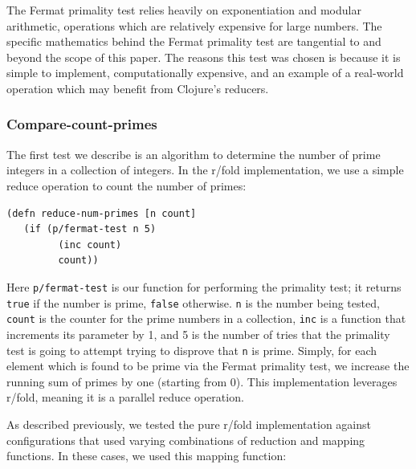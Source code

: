 \documentclass[12pt]{article}
\newcommand{\comment}[1]{{\bf \tt  {#1}}}
\newcommand{\emcomment}[1]{\textcolor{ForestGreen}{\comment{Elena: {#1}}}}
\newcommand{\joecomment}[1]{\textcolor{JoesGold}{\comment{Joe: {#1}}}}
\newcommand{\clocode}[1]{{\texttt {#1}}}
\begin{document}
The Fermat primality test relies heavily on exponentiation and modular arithmetic, operations which are relatively expensive for large numbers. %
The specific mathematics behind the Fermat primality test are tangential to and beyond the scope of this paper. The reasons this test was chosen is 
because it is simple to implement, computationally expensive, and an example of a real-world operation which may benefit from Clojure's reducers. 

\subsubsection{Compare-count-primes}\label{sec:count-primes}
The first test we describe is an algorithm to determine the number of prime integers in a  collection of integers. In the %
r/fold implementation, we use a simple reduce operation to count the number of primes:

\begin{verbatim}
(defn reduce-num-primes [n count] 
   (if (p/fermat-test n 5)
         (inc count)
         count))
\end{verbatim}
Here \clocode{p/fermat-test} is our function for performing the primality test; it returns \clocode{true} if the number is prime, \clocode{false} otherwise. \clocode{n} is the number being tested, \clocode{count} is the counter for the prime numbers in a collection, \clocode{inc} is a function that increments its parameter by 1, and 5 is the number of tries that the primality test is going to attempt trying to disprove that \clocode{n} is prime. 
Simply, for each element which is found to be prime via the Fermat primality test, we increase the running sum of primes by one (starting from 0). This implementation leverages r/fold, meaning it is a parallel reduce operation. 

As described previously, we tested the pure r/fold implementation against configurations that used varying combinations of reduction and mapping functions. In these cases, we used this mapping function:
\end{document}
